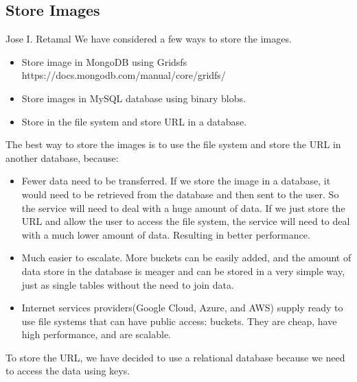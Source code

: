 \subsection{Store Images}
Jose I. Retamal
\vskip 0.1in
\indent
\indent
We have considered a few ways to store the images.


\begin{itemize}
	\item Store image in MongoDB using Gridsfs https://docs.mongodb.com/manual/core/gridfs/
	
	\item Store images in MySQL database using binary blobs. 
	
	\item  Store in the file system and store URL in a database.
\end{itemize}


The best way to store the images is to use the file system and store the URL in another database, because:
\begin{itemize}
	\item Fewer data need to be transferred. If we store the image in a database, it would need to be retrieved from the database and then sent to the user. So the service will need to deal with a huge amount of data. If we just store the URL and allow the user to access the file system, the service will need to deal with a much lower amount of data. Resulting in better performance.
	
	\item Much easier to escalate. More buckets can be easily added, and the amount of data store in the database is meager and can be stored in a very simple way, just as single tables without the need to join data.
	
	\item Internet services providers(Google Cloud, Azure, and AWS) supply ready to use file systems that can have public access: buckets. They are cheap, have high performance, and are scalable.
\end{itemize}

To store the URL, we have decided to use a relational database because we need to access the data using keys. 


